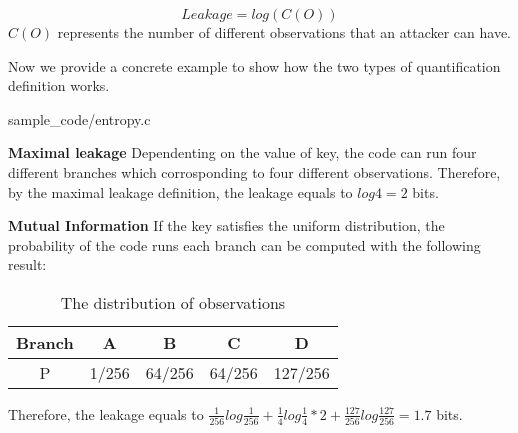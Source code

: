 \begin{equation}
    Leakage = log(C(O))
\end{equation}
$C(O)$ represents the number of different observations that an attacker can have.

Now we provide a concrete example to show how the two types of quantification definition works.

                 {sample_code/entropy.c}

\textbf{Maximal leakage} 
Dependenting on the value of key, the code can run four different branches which corrosponding to 
four different observations. Therefore, by the maximal leakage definition, the leakage equals to 
$log4 = 2$ bits.

\textbf{Mutual Information} If the key satisfies the uniform distribution, the probability of the code runs each branch
can be computed with the following result: 
\begin{table}[h]
\centering
\begin{tabular}{|c|c|c|c|c|}
\hline
Branch & A     & B      & C      & D       \\ \hline
P      & 1/256 & 64/256 & 64/256 & 127/256 \\ \hline
\end{tabular}
\caption{The distribution of observations}
\end{table}
Therefore, the leakage equals to 
$\frac{1}{256}log\frac{1}{256} + \frac{1}{4}log\frac{1}{4}*2 + \frac{127}{256}log\frac{127}{256} = 1.7$ bits.
